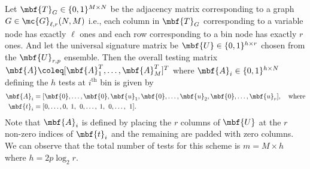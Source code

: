 \documentclass[conference,twocolumn]{IEEEtran}
\begin{document}
 Let $\mbf{T}_{G}\in\{0,1\}^{M\times N }$ be the adjacency matrix corresponding to a graph $G\in\mc{G}_{\ell,r}(N,M)$ i.e., each column in $\mbf{T}_{G}$ corresponding to a variable node has exactly $\ell$ ones and each row corresponding to a bin node has exactly $r$ ones. And let the universal signature matrix be $\mbf{U}\in\{0,1\}^{h \times r}$ chosen from the $\mbf{U}_{r,p}$ ensemble. Then the overall testing matrix $\mbf{A}\coleq [\mbf{A}_{1}^{T},\ldots,\mbf{A}_{M}^{T}]^T$ where $\mbf{A}_{i}\in\{0,1\}^{h\times N}$ defining the $h$ tests at $i^{\text{th}}$ bin is given by
 \begin{align}
 \mbf{A}_i&=[\mbf{0},\ldots,\mbf{0},\mbf{u}_1, \mbf{0},\ldots, \mbf{u}_2,\mbf{0}, \ldots, \mbf{u}_{r}],\quad \text{where}\label{Eqn:TestingMatrixDefn}\\
\mbf{t}_i &= [0,\ldots,0,\hspace{0.6ex}1,\hspace{0.9ex} 0, \ldots,\hspace{0.6ex}1,\hspace{0.9ex}0, \ldots, \hspace{0.9ex}1].\nonumber
 \end{align}
Note that $\mbf{A}_i$ is defined by placing the $r$ columns of $\mbf{U}$ at the $r$ non-zero indices of $\mbf{t}_i$ and the remaining are padded with zero columns. We can observe that the total number of tests for this scheme is $m=M\times h$ where $h=2p\log_2 r$.
\end{document}
